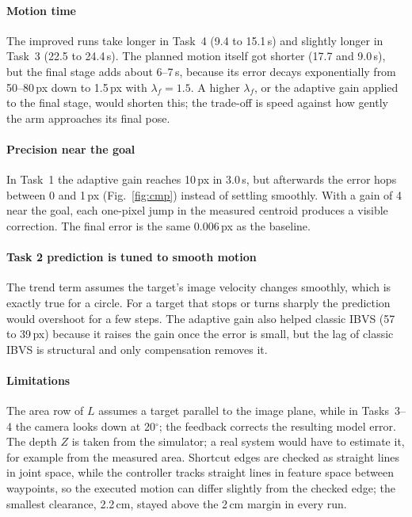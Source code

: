 \documentclass[11pt,a4paper]{article}
\begin{document}
\paragraph{Motion time} The improved runs take longer in Task~4 (9.4 to 15.1\,s) and slightly longer in
Task~3 (22.5 to 24.4\,s). The planned motion itself got shorter (17.7 and 9.0\,s), but the final stage
adds about 6--7\,s, because its error decays exponentially from 50--80\,px down to 1.5\,px with
$\lambda_f=1.5$. A higher $\lambda_f$, or the adaptive gain applied to the final stage, would shorten
this; the trade-off is speed against how gently the arm approaches its final pose.

\paragraph{Precision near the goal} In Task~1 the adaptive gain reaches 10\,px in 3.0\,s, but afterwards
the error hops between 0 and 1\,px (Fig.~\ref{fig:cmp}) instead of settling smoothly. With a gain of 4
near the goal, each one-pixel jump in the measured centroid produces a visible correction. The final
error is the same 0.006\,px as the baseline.

\paragraph{Task 2 prediction is tuned to smooth motion} The trend term assumes the target's image
velocity changes smoothly, which is exactly true for a circle. For a target that stops or turns
sharply the prediction would overshoot for a few steps. The adaptive gain also helped classic IBVS
(57 to 39\,px) because it raises the gain once the error is small, but the lag of classic IBVS is
structural and only compensation removes it.

\paragraph{Limitations} The area row of $L$ assumes a target parallel to the image plane, while in
Tasks~3--4 the camera looks down at 20$^{\circ}$; the feedback corrects the resulting model error. The
depth $Z$ is taken from the simulator; a real system would have to estimate it, for example from the
measured area. Shortcut edges are checked as straight lines in joint space, while the controller tracks
straight lines in feature space between waypoints, so the executed motion can differ slightly from the
checked edge; the smallest clearance, 2.2\,cm, stayed above the 2\,cm margin in every run.
\end{document}
